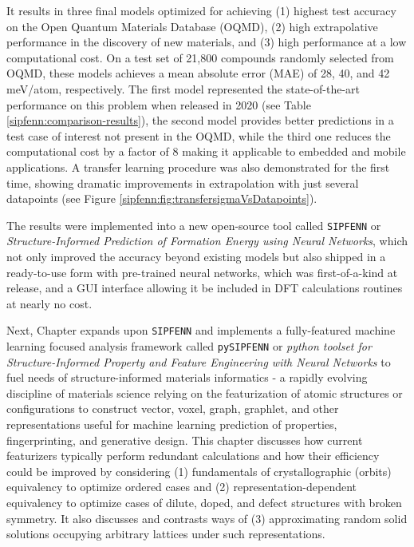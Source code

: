 It results in three final models optimized for achieving (1) highest test accuracy on the Open Quantum Materials Database (OQMD), (2) high extrapolative performance in the discovery of new materials, and (3) high performance at a low computational cost. On a test set of 21,800 compounds randomly selected from OQMD, these models achieves a mean absolute error (MAE) of 28, 40, and 42 meV/atom, respectively. The first model represented the state-of-the-art performance on this problem when released in 2020 \cite{Krajewski2020SIPFENNModels} (see Table \ref{sipfenn:comparison-results}), the second model provides better predictions in a test case of interest not present in the OQMD, while the third one reduces the computational cost by a factor of 8 making it applicable to embedded and mobile applications. A transfer learning procedure was also demonstrated for the first time, showing dramatic improvements in extrapolation with just several datapoints (see Figure \ref{sipfenn:fig:transfersigmaVsDatapoints}).

The results were implemented into a new open-source tool called \texttt{SIPFENN} or \textit{Structure-Informed Prediction of Formation Energy using Neural Networks}, which not only improved the accuracy beyond existing models but also shipped in a ready-to-use form with pre-trained neural networks, which was first-of-a-kind at release, and a GUI interface allowing it be included in DFT calculations routines at nearly no cost.


Next, Chapter  expands upon \texttt{SIPFENN} and implements a fully-featured machine learning focused analysis framework called \texttt{pySIPFENN} or \textit{python toolset for Structure-Informed Property and Feature Engineering with Neural Networks} to fuel needs of structure-informed materials informatics - a rapidly evolving discipline of materials science relying on the featurization of atomic structures or configurations to construct vector, voxel, graph, graphlet, and other representations useful for machine learning prediction of properties, fingerprinting, and generative design. This chapter discusses how current featurizers typically perform redundant calculations and how their efficiency could be improved by considering (1) fundamentals of crystallographic (orbits) equivalency to optimize ordered cases and (2) representation-dependent equivalency to optimize cases of dilute, doped, and defect structures with broken symmetry. It also discusses and contrasts ways of (3) approximating random solid solutions occupying arbitrary lattices under such representations.


